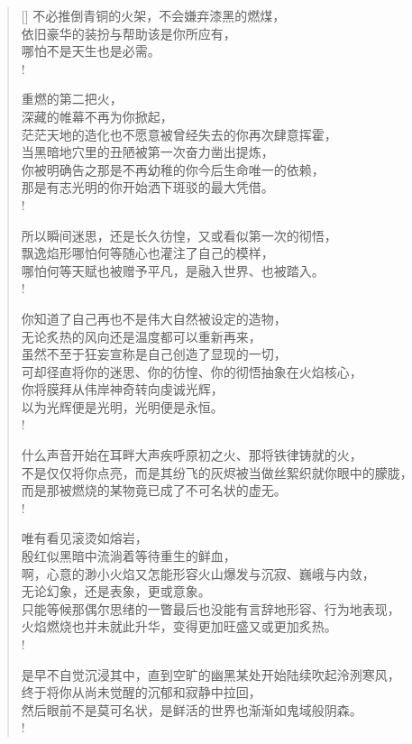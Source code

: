 \documentclass[UTF8, 12pt, a4paper]{ctexrep} %
\begin{document}
\begin{verse}[\versewidth]
不必推倒青铜的火架，不会嫌弃漆黑的燃煤，\\
依旧豪华的装扮与帮助该是你所应有，\\
哪怕不是天生也是必需。\\!

重燃的第二把火，\\
深藏的帷幕不再为你掀起，\\
茫茫天地的造化也不愿意被曾经失去的你再次肆意挥霍，\\
当黑暗地穴里的丑陋被第一次奋力凿出提炼，\\
你被明确告之那是不再幼稚的你今后生命唯一的依赖，\\
那是有志光明的你开始洒下斑驳的最大凭借。\\!

所以瞬间迷思，还是长久彷惶，又或看似第一次的彻悟，\\
飘逸焰形哪怕何等随心也灌注了自己的模样，\\
哪怕何等天赋也被赠予平凡，是融入世界、也被踏入。\\!

你知道了自己再也不是伟大自然被设定的造物，\\
无论炙热的风向还是温度都可以重新再来，\\
虽然不至于狂妄宣称是自己创造了显现的一切，\\
可却径直将你的迷思、你的彷惶、你的彻悟抽象在火焰核心，\\
你将膜拜从伟岸神奇转向虔诚光辉，\\
以为光辉便是光明，光明便是永恒。\\!

什么声音开始在耳畔大声疾呼原初之火、那将铁律铸就的火，\\
不是仅仅将你点亮，而是其纷飞的灰烬被当做丝絮织就你眼中的朦胧，\\
而是那被燃烧的某物竟已成了不可名状的虚无。\\!

唯有看见滚烫如熔岩，\\
殷红似黑暗中流淌着等待重生的鲜血，\\
啊，心意的渺小火焰又怎能形容火山爆发与沉寂、巍峨与内敛，\\
无论幻象，还是表象，更或意象。\\
只能等候那偶尔思绪的一瞥最后也没能有言辞地形容、行为地表现，\\
火焰燃烧也并未就此升华，变得更加旺盛又或更加炙热。\\!

是早不自觉沉浸其中，直到空旷的幽黑某处开始陆续吹起泠洌寒风，\\
终于将你从尚未觉醒的沉郁和寂静中拉回，\\
然后眼前不是莫可名状，是鲜活的世界也渐渐如鬼域般阴森。\\!


\end{verse}
\end{document}
